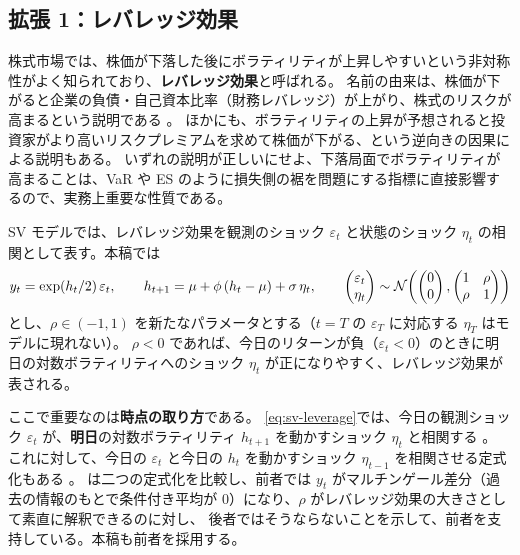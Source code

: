 \subsection{拡張 1：レバレッジ効果}\label{sec:model-leverage}

株式市場では、株価が下落した後にボラティリティが上昇しやすいという非対称性がよく知られており、\textbf{レバレッジ効果}と呼ばれる。
名前の由来は、株価が下がると企業の負債・自己資本比率（財務レバレッジ）が上がり、株式のリスクが高まるという説明である \parencite{christie1982}。
ほかにも、ボラティリティの上昇が予想されると投資家がより高いリスクプレミアムを求めて株価が下がる、という逆向きの因果による説明もある。
いずれの説明が正しいにせよ、下落局面でボラティリティが高まることは、VaR や ES のように損失側の裾を問題にする指標に直接影響するので、実務上重要な性質である。

SV モデルでは、レバレッジ効果を観測のショック $\varepsilon_t$ と状態のショック $\eta_t$ の相関として表す。本稿では
\begin{equation}
  y_t = \exp(h_t/2)\,\varepsilon_t, \qquad
  h_{t+1} = \mu + \phi\,(h_t - \mu) + \sigma\,\eta_t, \qquad
  \begin{pmatrix} \varepsilon_t \\ \eta_t \end{pmatrix} \sim \mathcal{N}\!\left( \begin{pmatrix} 0 \\ 0 \end{pmatrix}, \begin{pmatrix} 1 & \rho \\ \rho & 1 \end{pmatrix} \right)
  \label{eq:sv-leverage}
\end{equation}
とし、$\rho \in (-1, 1)$ を新たなパラメータとする（$t = T$ の $\varepsilon_T$ に対応する $\eta_T$ はモデルに現れない）。
$\rho < 0$ であれば、今日のリターンが負（$\varepsilon_t < 0$）のときに明日の対数ボラティリティへのショック $\eta_t$ が正になりやすく、レバレッジ効果が表される。

ここで重要なのは\textbf{時点の取り方}である。
\cref{eq:sv-leverage}では、今日の観測ショック $\varepsilon_t$ が、\textbf{明日}の対数ボラティリティ $h_{t+1}$ を動かすショック $\eta_t$ と相関する
\parencite{harvey1996,omori2007}。
これに対して、今日の $\varepsilon_t$ と今日の $h_t$ を動かすショック $\eta_{t-1}$ を相関させる定式化もある \parencite{jacquier2004}。
\textcite{yu2005} は二つの定式化を比較し、前者では $y_t$ がマルチンゲール差分（過去の情報のもとで条件付き平均が 0）になり、$\rho$ がレバレッジ効果の大きさとして素直に解釈できるのに対し、
後者ではそうならないことを示して、前者を支持している。本稿も前者を採用する。

